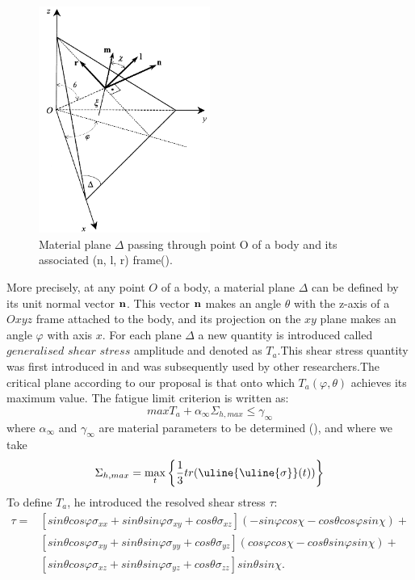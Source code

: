 \begin{figure}[h!]
	\centering
	\includegraphics[width=0.5\textwidth]{figures//demopp.png} 
	\caption{Material plane $\Delta$ passing through point O of a body and its
		associated (n, l, r) frame(\cite{papadopoulos1993fatigue}).}
	\label{fig50}
\end{figure}
More precisely, at any point $O$ of a body, a material plane $\Delta$ can be defined by its unit normal vector $\bf n$. This vector
$\bf n$ makes an angle $\theta$ with the z-axis of a $Oxyz$ frame attached to the body, and its projection on the $xy$ plane
makes an angle $\varphi$ with axis $x$. For each plane $\Delta$ a new quantity is introduced called $generalised$ $shear$ $stress$ amplitude and denoted as $T_a$.This shear stress quantity was first introduced in \cite{papadopoulos2001long}
and was subsequently used by other researchers.The critical plane according to our proposal is that onto which $T_a(\varphi,\theta)$ achieves its maximum value. The fatigue limit criterion is written as:
\begin{equation}
max T_a+\alpha_\infty \Sigma_{h,max}\leqslant \gamma_\infty
\end{equation}
where $\alpha_\infty$ and $\gamma_\infty$ are material parameters to be determined (\cite{papadopoulos2001long}), and where we take
$$\Sigma_{h,max}=\max\limits_{t}\left\lbrace \frac{1}{3}tr(\uline{\uline{\sigma}}(t))\right\rbrace $$
To define $T_a$, he introduced the resolved shear stress $\tau$:
\begin{equation}
\begin{split}
\tau=&[sin\theta cos\varphi\sigma_{xx}+sin\theta sin\varphi\sigma_{xy}+cos\theta\sigma_{xz}](-sin\varphi cos\chi-cos\theta cos\varphi sin\chi)+\\&[sin\theta cos\varphi\sigma_{xy}+sin\theta sin\varphi\sigma_{yy}+cos\theta\sigma_{yz}](cos\varphi cos\chi-cos\theta sin\varphi sin\chi)+\\&[sin\theta cos\varphi\sigma_{xz}+sin\theta sin\varphi\sigma_{yz}+cos\theta\sigma_{zz}]sin\theta sin\chi .
\end{split} 
\label{eqres}
\end{equation}
